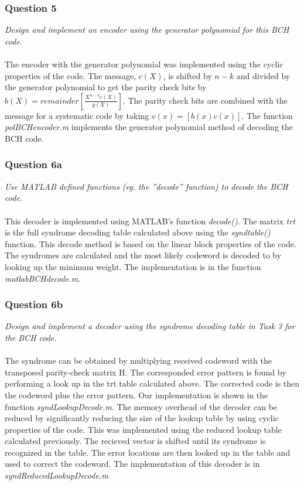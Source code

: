 \documentclass[a4paper]{article}
\begin{document}
\subsubsection{Question 5} \textit{Design and implement an encoder using the generator polynomial for this BCH code.} \\
\\
The encoder with the generator polynomial was implemented using the cyclic properties of the code. The message, $c(X)$, is shifted by $n-k$ and divided by the generator polynomial to get the parity check bits by $b(X) = remainder[\frac{X^{n-k}c(X)}{g(X)}]$. The parity check bits are combined with the message for a systematic code by taking $v(x) = [b(x) c(x)]$. The function \textit{polBCHencoder.m} implements the generator polynomial method of decoding the BCH code.

\subsubsection{Question 6a} \textit{Use MATLAB defined functions (eg. the ”decode” function) to decode the BCH code.}\\
\\
This decoder is implemented using MATLAB’s function \textit{decode()}. The matrix \textit{trt} is the full syndrome decoding table calculated above using the \textit{syndtable()} function. This decode method is based on the linear block properties of the code. The syndromes are calculated and the most likely codeword is decoded to by looking up the minimum weight. The implementation is in the function \textit{matlabBCHdecode.m}.

\subsubsection{Question 6b} \textit{Design and implement a decoder using the syndrome decoding table in Task 3 for the BCH code.}\\
\\
The syndrome can be obtained by multiplying received codeword with the transposed parity-check matrix H. The corresponded error pattern is found by performing a look up in the trt table calculated above. The corrected code is then the codeword plus the error pattern. Our implementation is shown in the function \textit{syndLookupDecode.m}. The memory overhead of the decoder can be reduced by significantly reducing the size of the lookup table by using cyclic properties of the code. This was implemented using the reduced lookup table calculated previously. The recieved vector is shifted until its syndrome is recognized in the table. The error locations are then looked up in the table and used to correct the codeword. The implementation of this decoder is in \textit{syndReducedLookupDecode.m}
\end{document}

